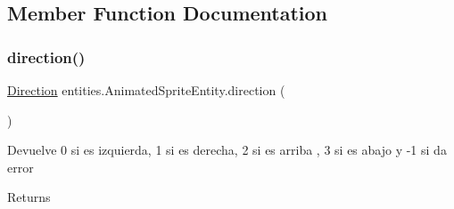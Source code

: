 \subsection{Member Function Documentation}
\mbox{\label{classentities_1_1_animated_sprite_entity_a74c87e881f72316f17e8e1a5e8e0fc8d}} 
\subsubsection{\texorpdfstring{direction()}{direction()}}
{\footnotesize\ttfamily \mbox{\hyperlink{enumentities_1_1_direction}{Direction}} entities.\+Animated\+Sprite\+Entity.\+direction (\begin{DoxyParamCaption}{ }\end{DoxyParamCaption})\hspace{0.3cm}{\ttfamily [inline]}}

Devuelve 0 si es izquierda, 1 si es derecha, 2 si es arriba , 3 si es abajo y -\/1 si da error

\begin{DoxyReturn}{Returns}

\end{DoxyReturn}

